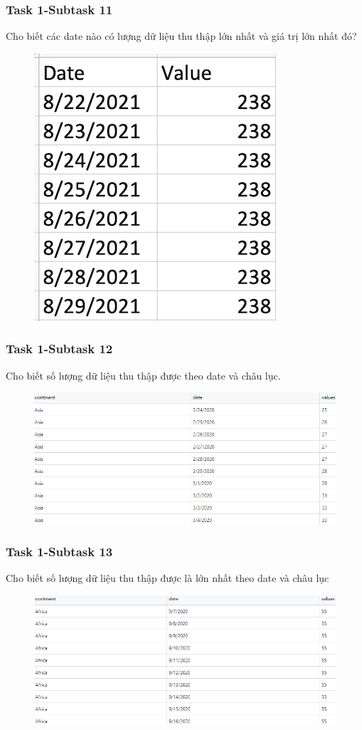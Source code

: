 \documentclass[english,10pt,table]{beamer}
\begin{document}
{
    \frametitle{Task 1-Subtask 11}
    \begin{block}{Cho biết các date nào có lượng dữ liệu thu thập lớn nhất và giá trị lớn nhất đó?}
    \begin{figure}[H]
				\centering
				\includegraphics[scale=0.8]{images/1.11.png}
			\end{figure}
    \end{block}
}
\frame
{
    \frametitle{Task 1-Subtask 12}
    \begin{block}{Cho biết số lượng dữ liệu thu thập được theo date và châu lục.}
    \begin{figure}[H]
				\centering
				\includegraphics[scale=0.45]{images/1.12.png}
			\end{figure}
    \end{block}
}
\frame
{
    \frametitle{Task 1-Subtask 13}
    \begin{block}{Cho biết số lượng dữ liệu thu thập được là lớn nhất theo date và châu lục}
    \begin{figure}[H]
				\centering
				\includegraphics[scale=0.45]{images/1.13.png}
			\end{figure}
    \end{block}
}
\end{document}
